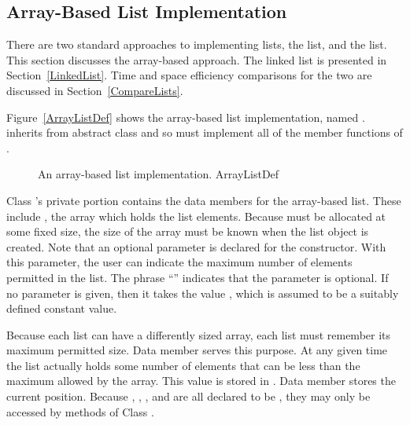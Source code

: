 \subsection{Array-Based List Implementation}
\label{ArrayList}

There are two standard approaches to implementing lists, the
 list, and the 
list.
This section discusses the array-based approach.
The linked list is presented in Section~\ref{LinkedList}.
Time and space efficiency comparisons for the two are discussed in
Section~\ref{CompareLists}.

Figure~\ref{ArrayListDef} shows
the array-based list implementation,
named .
 inherits
from abstract class 
and so must implement all of the member functions of .

\begin{figure}

\vspace{-\bigskipamount}
{An array-based list implementation.}
{ArrayListDef}
\end{figure}

\begin{figure}

\vspace{-\smallskipamount}
\captcont
\vspace{-\bigskipamount}
\end{figure}

Class 's private portion contains the data members for
the array-based list.
These include , the array which holds the list
elements.
Because  must be allocated at some fixed size,
the size of the array must be known when the list object is created.
Note that an optional parameter is declared for the 
constructor.
With this parameter, the user can indicate the maximum
number of elements permitted in the list.
{The phrase ``'' indicates that the parameter is
optional.}{}
If no parameter is given, then it takes the value
, which is assumed to be a suitably defined
constant value.

Because each list can have a differently sized array, each list must
remember its maximum permitted size.
Data member  serves this purpose.
At any given time the list actually holds some number
of elements that can be less than the maximum allowed by the array.
This value is stored in .
Data member  stores the current position.
Because , , , and 
 are all declared to be , they may only
be accessed by methods of Class .

